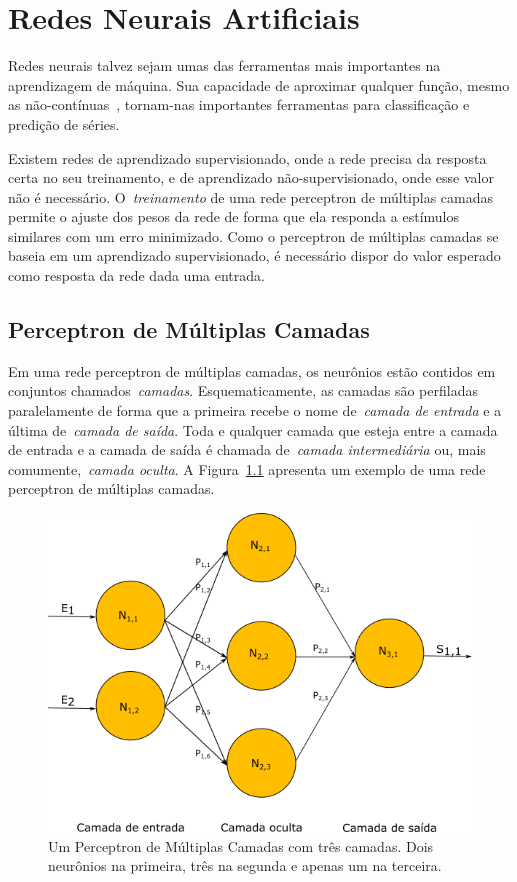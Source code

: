 \chapter{Redes Neurais Artificiais}
\label{Cap:RedesNeurais}

Redes neurais talvez sejam umas das ferramentas mais importantes na aprendizagem de máquina. Sua capacidade de aproximar qualquer função, mesmo as não-contínuas~\cite{LIVRO:2009.9788591020805}, tornam-nas importantes ferramentas para classificação e predição de séries.

Existem redes de aprendizado supervisionado, onde a rede precisa da resposta certa no seu treinamento, e de aprendizado não-supervisionado, onde esse valor não é necessário. O~\emph{treinamento} de uma rede perceptron de múltiplas camadas permite o ajuste dos pesos da rede de forma que ela responda a estímulos similares com um erro minimizado. Como o perceptron de múltiplas camadas se baseia em um aprendizado supervisionado, é necessário dispor do valor esperado como resposta da rede dada uma entrada. 

\section{Perceptron de Múltiplas Camadas}

Em uma rede perceptron de múltiplas camadas, os neurônios estão contidos em conjuntos chamados~\emph{camadas}. Esquematicamente, as camadas são perfiladas paralelamente de forma que a primeira recebe o nome de~\emph{camada de entrada} e a última de~\emph{camada de saída}. Toda e qualquer camada que esteja entre a camada de entrada e a camada de saída é chamada de~\emph{camada intermediária} ou, mais comumente,~\emph{camada oculta}. A Figura~\ref{Fig:MlpEsquema} apresenta um exemplo de uma rede perceptron de múltiplas camadas.

\begin{figure}[htb]
  \centering
  \includegraphics[scale=0.75]{images/MlpEsquema.png}
  \caption{Um Perceptron de Múltiplas Camadas com três camadas. Dois neurônios na primeira, três na segunda e apenas um na terceira.}
    \label{Fig:MlpEsquema}
\end{figure}

